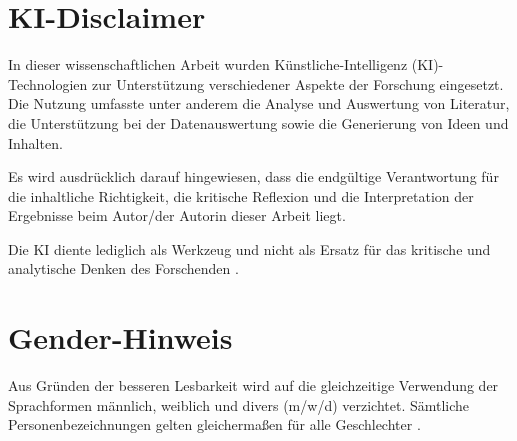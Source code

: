 




\thispagestyle{empty}

\section{KI-Disclaimer}

In dieser wissenschaftlichen Arbeit wurden Künstliche-Intelligenz (KI)-Technologien zur Unterstützung verschiedener Aspekte der Forschung eingesetzt. Die Nutzung umfasste unter anderem die Analyse und Auswertung von Literatur, die Unterstützung bei der Datenauswertung sowie die Generierung von Ideen und Inhalten.

Es wird ausdrücklich darauf hingewiesen, dass die endgültige Verantwortung für die inhaltliche Richtigkeit, die kritische Reflexion und die Interpretation der Ergebnisse beim Autor/der Autorin dieser Arbeit liegt.

Die KI diente lediglich als Werkzeug und nicht als Ersatz für das kritische und analytische Denken des Forschenden \parencite{a1astudie_2024_ki}.

\section{Gender-Hinweis}

Aus Gründen der besseren Lesbarkeit wird auf die gleichzeitige Verwendung der Sprachformen männlich, weiblich und divers (m/w/d) verzichtet. Sämtliche Personenbezeichnungen gelten gleichermaßen für alle Geschlechter \parencite{missel_2022_genderhinweis}.

\newpage